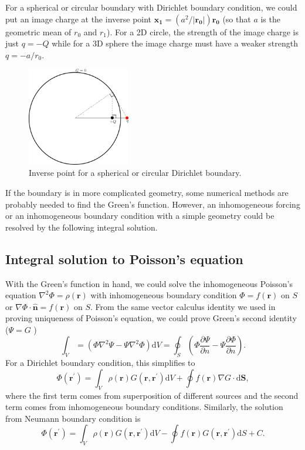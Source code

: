 \documentclass{article}
\begin{document}
For a spherical or circular boundary with Dirichlet boundary condition, we could put an image charge at the inverse point $\mathbf{x_1} = (a^{2} / \left\vert \mathbf{r_0}  \right\vert ) \mathbf{r_0} $ (so that $a$ is the geometric mean of $r_0$ and $r_1$). For a 2D circle, the strength of the image charge is just $q = -Q$ while for a 3D sphere the image charge must have a weaker strength $q = -a/r_0.$
\begin{figure}[ht]
    \centering
    \includegraphics[width=0.4\textwidth]{figs/chap3_inverse_point_dirichlet.png}
    \caption{Inverse point for a spherical or circular Dirichlet boundary.}
    \label{fig:chap3-inverse}
\end{figure}

If the boundary is in more complicated geometry, some numerical methods are probably needed to find the Green's function. However, an inhomogeneous forcing or an inhomogeneous boundary condition with a simple geometry could be resolved by the following integral solution. 
\subsection{Integral solution to Poisson's equation}
With the Green's function in hand, we could solve the inhomogeneous Poisson's equation $\nabla ^{2} \Phi = \rho(\mathbf{r} )$ with inhomogeneous boundary condition $\Phi = f(\mathbf{r})$ on $S$ or $\nabla \Phi \cdot \mathbf{\hat{n} } = f(\mathbf{r})$ on $S.$ From the same vector calculus identity we used in proving uniqueness of Poisson's equation, we could prove Green's second identity ($\Psi = G$ )
\[
    \boxed{ 
        \int_V = (\Phi \nabla^{2} \Psi  - \Psi \nabla ^{2} \Phi ) \mathrm{d} V = 
        \oint_S \left( \Phi \frac{\partial \Psi }{\partial n} - \Psi \frac{\partial \Phi }{\partial n} \right). 
    }
\]
For a Dirichlet boundary condition, this simplifies to 
\[
    \boxed{
        \Phi (\mathbf{r^\prime } ) = \int_V \rho(\mathbf{r} ) G(\mathbf{r}, \mathbf{r^\prime } ) \mathrm{d} V + \oint f(\mathbf{r} ) \nabla G \cdot \mathrm{d} \mathbf{S},  
    }
\]
where the first term comes from superposition of different sources and the second term comes from inhomogeneous boundary conditions. Similarly, the solution from Neumann boundary condition is
\[
    \boxed{ 
        \Phi (\mathbf{r^\prime } ) = \int_V \rho(\mathbf{r} ) G(\mathbf{r}, \mathbf{r^\prime } ) \mathrm{d} V - \oint f(\mathbf{r} ) G(\mathbf{r}, \mathbf{r^\prime } ) \mathrm{d}S + C.
    }
\]
\end{document}
